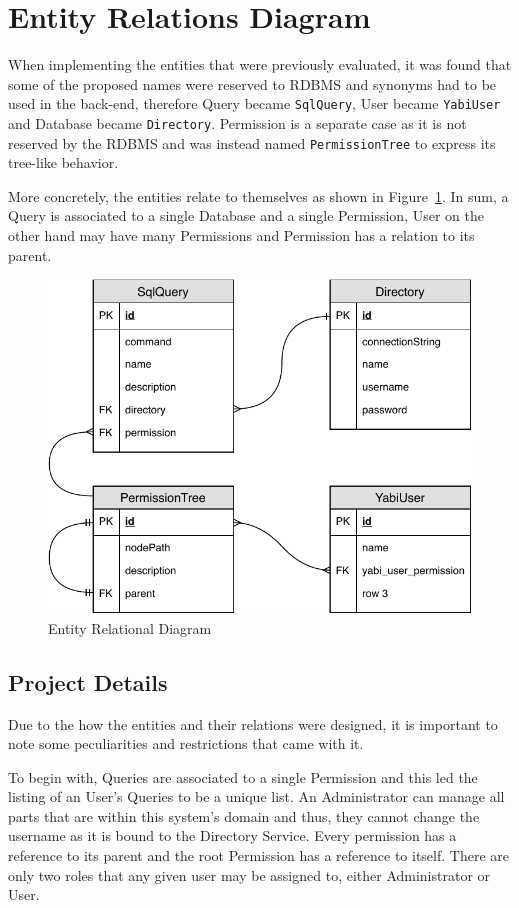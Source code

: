 \section{Entity Relations Diagram}\label{tities}
When implementing the entities that were previously evaluated, it was found that some of the proposed names were reserved to \gls{RDBMS} and synonyms had to be used in the back-end, therefore Query became \texttt{SqlQuery}, User became \texttt{YabiUser} and Database became \texttt{Directory}. Permission is a separate case as it is not reserved by the \gls{RDBMS} and was instead named \texttt{PermissionTree} to express its tree-like behavior.

More concretely, the entities relate to themselves as shown in Figure~\ref{fig:er}. In sum, a Query is associated to a single Database and a single Permission, User on the other hand may have many Permissions and Permission has a relation to its parent.

\begin{figure}
  \centering
  \includegraphics[width=.7\textwidth]{images/diagramas/er}
  \caption{Entity Relational Diagram}\label{fig:er}
\end{figure}

\subsection{Project Details}\label{p:details}
Due to the how the entities and their relations were designed, it is important to note some peculiarities and restrictions that came with it.

To begin with, Queries are associated to a single Permission and this led the listing of an User's Queries to be a unique list. An Administrator can manage all parts that are within this system's domain and thus, they cannot change the username as it is bound to the Directory Service. Every permission has a reference to its parent and the root Permission has a reference to itself. There are only two roles that any given user may be assigned to, either Administrator or User.

